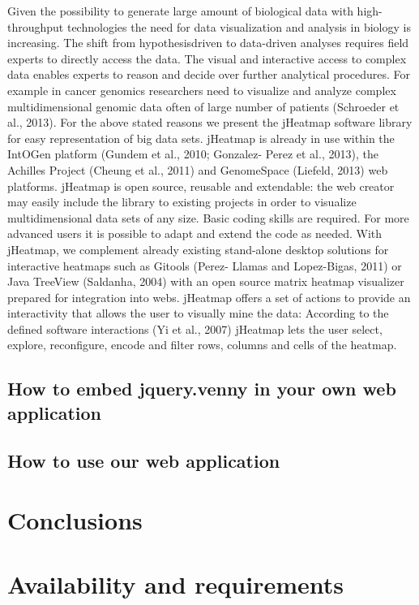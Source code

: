\documentclass{bmcart}
\begin{document}
Given the possibility to generate large amount of biological data
with high-throughput technologies the need for data visualization
and analysis in biology is increasing. The shift from hypothesisdriven
to data-driven analyses requires field experts to directly
access the data. The visual and interactive access to complex data
enables experts to reason and decide over further analytical
procedures. For example in cancer genomics researchers need to
visualize and analyze complex multidimensional genomic data
often of large number of patients (Schroeder et al., 2013). For the
above stated reasons we present the jHeatmap software library for
easy representation of big data sets. jHeatmap is already in use
within the IntOGen platform (Gundem et al., 2010; Gonzalez-
Perez et al., 2013), the Achilles Project (Cheung et al., 2011) and
GenomeSpace (Liefeld, 2013) web platforms. jHeatmap is open
source, reusable and extendable: the web creator may easily
include the library to existing projects in order to visualize
multidimensional data sets of any size. Basic coding skills are
required. For more advanced users it is possible to adapt and
extend the code as needed.
With jHeatmap, we complement already existing stand-alone
desktop solutions for interactive heatmaps such as Gitools (Perez-
Llamas and Lopez-Bigas, 2011) or Java TreeView (Saldanha,
2004) with an open source matrix heatmap visualizer prepared for
integration into webs. jHeatmap offers a set of actions to provide
an interactivity that allows the user to visually mine the data:
According to the defined software interactions (Yi et al., 2007)
jHeatmap lets the user select, explore, reconfigure, encode and
filter rows, columns and cells of the heatmap.


\subsection*{How to embed jquery.venny in your own web application}

\subsection*{How to use our web application}

\section*{Conclusions}

\section*{Availability and requirements}
\end{document}
